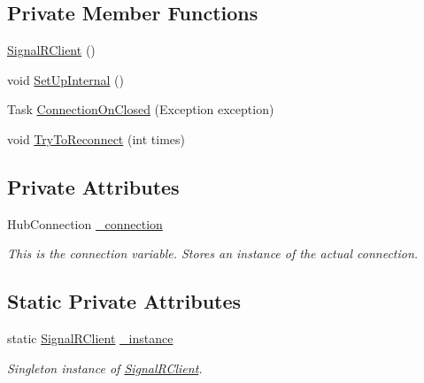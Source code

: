 \subsection*{Private Member Functions}
\begin{DoxyCompactItemize}
\item 
\mbox{\hyperlink{class_master_application_1_1_signal_r_client_a7ada19145378cc311e1b206ebb2378b1}{Signal\+R\+Client}} ()
\item 
void \mbox{\hyperlink{class_master_application_1_1_signal_r_client_a092a3b2db4b336cbe6ef675ac614fddd}{Set\+Up\+Internal}} ()
\item 
Task \mbox{\hyperlink{class_master_application_1_1_signal_r_client_a9cb6f0f00bf7784e304dee3a4a9032f5}{Connection\+On\+Closed}} (Exception exception)
\item 
void \mbox{\hyperlink{class_master_application_1_1_signal_r_client_a1bc49180200db122a1a8b4079d2be1c0}{Try\+To\+Reconnect}} (int times)
\end{DoxyCompactItemize}
\subsection*{Private Attributes}
\begin{DoxyCompactItemize}
\item 
Hub\+Connection \mbox{\hyperlink{class_master_application_1_1_signal_r_client_a1c022935782db7f0d405a2b30874ec35}{\+\_\+connection}}
\begin{DoxyCompactList}\small\item\em This is the connection variable. Stores an instance of the actual connection. \end{DoxyCompactList}\end{DoxyCompactItemize}
\subsection*{Static Private Attributes}
\begin{DoxyCompactItemize}
\item 
static \mbox{\hyperlink{class_master_application_1_1_signal_r_client}{Signal\+R\+Client}} \mbox{\hyperlink{class_master_application_1_1_signal_r_client_a6ee898fc7dabd1c137b6eb1342df475f}{\+\_\+instance}}
\begin{DoxyCompactList}\small\item\em Singleton instance of \mbox{\hyperlink{class_master_application_1_1_signal_r_client}{Signal\+R\+Client}}. \end{DoxyCompactList}\end{DoxyCompactItemize}


